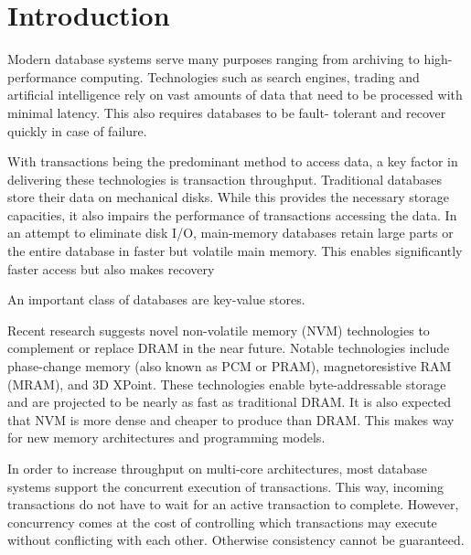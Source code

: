 \chapter{Introduction}



Modern database systems serve many purposes ranging from archiving to 
high-performance computing. Technologies such as search engines, trading 
and artificial intelligence rely on vast amounts of data that need to be 
processed with minimal latency. This also requires databases to be fault-
tolerant and recover quickly in case of failure.

With transactions being the predominant method to access data, a key factor 
in delivering these technologies is transaction throughput. Traditional 
databases store their data on mechanical disks. While this provides the 
necessary storage capacities, it also impairs the performance of transactions
accessing the data. In an attempt to eliminate disk I/O, main-memory databases
retain large parts or the entire database in faster but volatile main memory.
This enables significantly faster access but also makes recovery 

An important class of databases are key-value stores.


Recent research suggests novel non-volatile memory (NVM) technologies to 
complement or replace DRAM in the near future. Notable technologies include 
phase-change memory (also known as PCM or PRAM), magnetoresistive RAM (MRAM), 
and 3D XPoint. These technologies enable byte-addressable storage and are 
projected to be nearly as fast as traditional DRAM. It is also expected that 
NVM is more dense and cheaper to produce than DRAM. This makes way for new 
memory architectures and programming models.


In order to increase throughput on multi-core architectures, most database 
systems support the concurrent execution of transactions. This way, incoming 
transactions do not have to wait for an active transaction to complete. 
However, concurrency comes at the cost of controlling which transactions may 
execute without conflicting with each other. Otherwise consistency cannot be 
guaranteed.

